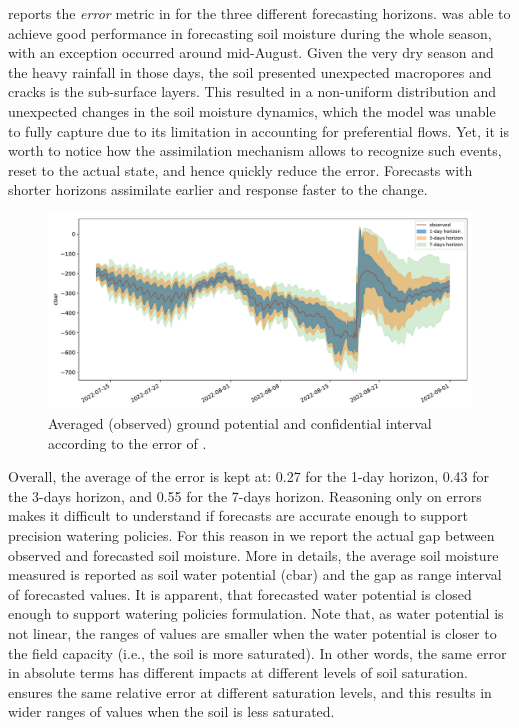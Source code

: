  reports the \textit{error} metric in  for the three different forecasting horizons.
\olab{} was able to achieve good performance in forecasting soil moisture during the whole season, with an exception occurred around mid-August.
%
Given the very dry season and the heavy rainfall in those days, the soil presented unexpected macropores and cracks is the sub-surface layers.
%
This resulted in a non-uniform distribution and unexpected changes in the soil moisture dynamics, which the model was unable to fully capture due to its limitation in accounting for preferential flows.
%
Yet, it is worth to notice how the assimilation mechanism allows \olab{} to recognize such events, reset to the actual state, and hence quickly reduce the error.
%
Forecasts with shorter horizons assimilate earlier and response faster to the change.

\begin{figure}[t]
    \centering
    \includegraphics[scale=.4]{chapters/physics-aware/orchard/img/forecasting_std_with_forbidden_sensors.pdf}
    \caption{Averaged (observed) ground potential and confidential interval according to the error of .}
    \label{orchard-fig:forecasting_std}
\end{figure}

Overall, the average of the error is kept at: 0.27 for the 1-day horizon, 0.43 for the 3-days horizon, and 0.55 for the 7-days horizon. %
%
Reasoning only on errors makes it difficult to understand if forecasts are accurate enough to support precision watering policies. For this reason in  we report the actual gap between observed and forecasted soil moisture.
%
More in details, the average soil moisture measured is reported as soil water potential (cbar) and the gap as range interval of forecasted values.
% 
It is apparent, that forecasted water potential is closed enough to support watering policies formulation. Note that, as water potential is not linear, the ranges of values are smaller when the water potential is closer to the field capacity (i.e., the soil is more saturated). In other words, the same error in absolute terms has different impacts at different levels of soil saturation. \olab{} ensures the same relative error at different saturation levels, and this results in wider ranges of values when the soil is less saturated.

